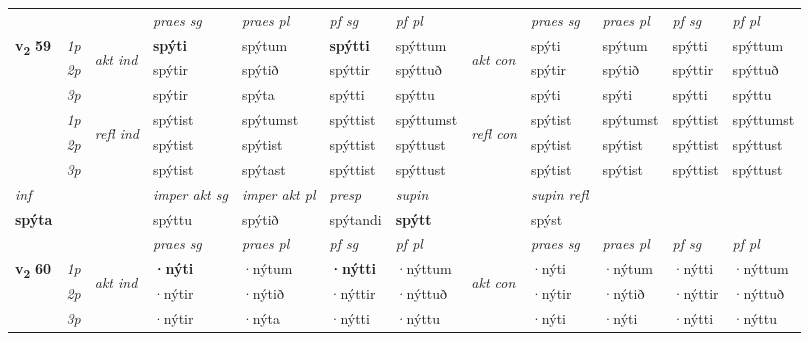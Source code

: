 \begin{longtable}[l]{X>{\footnotesize\itshape}llXXXXlXXXX}
 & &   & \textit{praes sg}  & \textit{praes pl}    & \textit{ pf sg} & \textit{pf pl} & & \textit{praes sg}  & \textit{praes pl}    & \textit{pf sg} & \textit{pf pl }  \\ \cmidrule{4-7} \cmidrule{9-12}
 \multirow{2}{*}{{{\textbf{v{\textsubscript{2}}} \Large{\textbf{59}}}}}  & 1p & \multirow{3}{*}{\begin{turn}{90}\textit{akt ind}\end{turn}} & \textbf{spýti} & spýtum & \textbf{spýtti} & spýttum & \multirow{3}{*}{\begin{turn}{90}\textit{akt con}\end{turn}} &spýti & spýtum & spýtti & spýttum\\*
 & 2p &  &  spýtir  & spýtið & spýttir & spýttuð & & spýtir & spýtið & spýttir & spýttuð \\*
 & 3p &  & spýtir & spýta & spýtti & spýttu & & spýti & spýti& spýtti & spýttu \\*
\cmidrule{4-7} \cmidrule{9-12}
 & 1p & \multirow{3}{*}{\begin{turn}{90}\textit{refl ind}\end{turn}}  & spýtist & spýtumst & spýttist & spýttumst & \multirow{3}{*}{\begin{turn}{90}\textit{refl con}\end{turn}}  &spýtist & spýtumst & spýttist & spýttumst \\*
 & 2p &  & spýtist & spýtist & spýttist & spýttust & &spýtist & spýtist & spýttist & spýttust \\*
 & 3p  & & spýtist & spýtast & spýttist & spýttust & & spýtist & spýtist& spýttist & spýttust \\*
\cmidrule{4-7} \cmidrule{9-12}

   {\textit{inf}} & &  & \textit{imper akt sg} & \textit{imper akt pl}   & \textit{presp} & \textit{supin} && \textit{supin refl}  \\*
  {\textbf{spýta}} & && spýttu  & spýtið   & spýtandi &  \textbf{spýtt} && spýst  \\*

\midrule

 & &   & \textit{praes sg}  & \textit{praes pl}    & \textit{ pf sg} & \textit{pf pl} & & \textit{praes sg}  & \textit{praes pl}    & \textit{pf sg} & \textit{pf pl }  \\ \cmidrule{4-7} \cmidrule{9-12}
 \multirow{2}{*}{{{\textbf{v{\textsubscript{2}}} \Large{\textbf{60}}}}}  & 1p & \multirow{3}{*}{\begin{turn}{90}\textit{akt ind}\end{turn}} & \textbf{·nýti} & ·nýtum & \textbf{·nýtti} & ·nýttum & \multirow{3}{*}{\begin{turn}{90}\textit{akt con}\end{turn}} &·nýti & ·nýtum & ·nýtti & ·nýttum\\*
 & 2p &  &  ·nýtir  & ·nýtið & ·nýttir & ·nýttuð & & ·nýtir & ·nýtið & ·nýttir & ·nýttuð \\*
 & 3p &  & ·nýtir & ·nýta & ·nýtti & ·nýttu & & ·nýti & ·nýti& ·nýtti & ·nýttu \\*
\cmidrule{4-7} \cmidrule{9-12}


\end{longtable}
